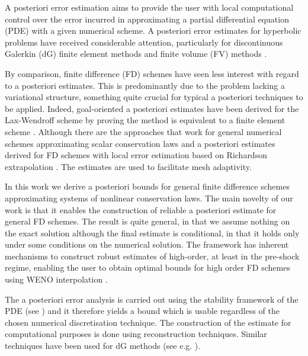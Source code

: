 \documentclass[final]{amsart}
\numberwithin{equation}{section}
\begin{document}
A posteriori error estimation aims to provide the user with local
computational control over the error incurred in approximating a
partial differential equation (PDE) with a given numerical scheme.  A
posteriori error estimates for hyperbolic problems have received
considerable attention, particularly for discontinuous Galerkin (dG)
finite element methods
\cite{johnson1990adaptive,johnson1995adaptive,dedner2007error,giesselmann2015posteriori,giesselmann2017posteriori,dedner2019residual,ainsworth2011posteriori,verfurth2013posteriori}
and finite volume (FV) methods
\cite{cockburn1994error,chen2014goal,barth2018finite,semplice2016adaptive,semplice2018adaptive}. 

By comparison, finite difference (FD) schemes have seen less interest
with regard to a posteriori estimates. This is predominantly due to
the problem lacking a variational structure, something quite crucial
for typical a posteriori techniques to be applied. Indeed,
goal-oriented a posteriori estimates have been derived for the
Lax-Wendroff scheme by proving the method is equivalent to a finite
element scheme \cite{collins2014posteriori}. Although there are the
approaches that work for general numerical schemes approximating
scalar conservation laws \cite{cockburn1995posteriori} and a
posteriori estimates derived for FD schemes with local error
estimation based on Richardson extrapolation
\cite{berger1984adaptive,arney1988posteriori} . The estimates are used
to facilitate mesh adaptivity.

In this work we derive a posteriori bounds for general finite
difference schemes approximating systems of nonlinear conservation
laws. The main novelty of our work is that it enables the construction
of reliable a posteriori estimate for general FD schemes. The result
is quite general, in that we assume nothing on the exact solution
although the final estimate is conditional, in that it holds only
under some conditions on the numerical solution. The framework has
inherent mechanisms to construct robust estimates of high-order, at
least in the pre-shock regime, enabling the user to obtain optimal
bounds for high order FD schemes using WENO interpolation
\cite{liu2009positivity,janett2019novel}.

The a posteriori error analysis is carried out using the stability
framework of the PDE (see \cite{giesselmann2015posteriori}) and it
therefore yields a bound which is usable regardless of the chosen
numerical discretisation technique.  The construction of the estimate
for computational purposes is done using reconstruction
techniques. Similar techniques have been used for dG methods (see
e.g. \cite{makridakis2007space,giesselmann2015posteriori,giesselmann2017posteriori,dedner2019residual}).
\end{document}
